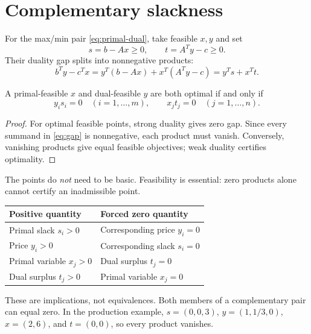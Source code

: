 \documentclass[11pt,a4paper]{article}
\begin{document}
\section{Complementary slackness}\label{sec:complementarity}
For the max/min pair \eqref{eq:primal-dual}, take feasible $x,y$ and set
\[
  s=b-Ax\geq0,\qquad t=A^Ty-c\geq0.
\]
Their duality gap splits into nonnegative products:
\begin{equation}\label{eq:gap}
  b^Ty-c^Tx=y^T(b-Ax)+x^T(A^Ty-c)=y^Ts+x^Tt.
\end{equation}
\begin{lecturecore}
  \begin{theorem}
    A primal-feasible $x$ and dual-feasible $y$ are both optimal if and only if
    \[
      y_is_i=0\quad(i=1,\ldots,m),\qquad x_jt_j=0\quad(j=1,\ldots,n).
    \]
  \end{theorem}
\end{lecturecore}
\begin{proof}
  For optimal feasible points, strong duality gives zero gap. Since every summand
  in \eqref{eq:gap} is nonnegative, each product must vanish. Conversely, vanishing
  products give equal feasible objectives; weak duality certifies optimality.
\end{proof}
The points do \emph{not} need to be basic. Feasibility is essential: zero products
alone cannot certify an inadmissible point.
\begin{center}
  \begin{tabular}{ll}\toprule
    Positive quantity & Forced zero quantity\\\midrule
    Primal slack $s_i>0$ & Corresponding price $y_i=0$\\
    Price $y_i>0$ & Corresponding slack $s_i=0$\\
    Primal variable $x_j>0$ & Dual surplus $t_j=0$\\
    Dual surplus $t_j>0$ & Primal variable $x_j=0$\\\bottomrule
  \end{tabular}
\end{center}
These are implications, not equivalences. Both members of a complementary pair
can equal zero. In the production example, $s=(0,0,3)$, $y=(1,1/3,0)$,
$x=(2,6)$, and $t=(0,0)$, so every product vanishes.
\end{document}

